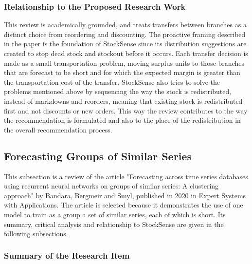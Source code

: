 \documentclass{StockSense}
\begin{document}
\subsubsection{Relationship to the Proposed Research Work}

This review is academically grounded, and treats transfers between branches as a distinct choice from reordering and discounting. The proactive framing described in the paper is the foundation of StockSense since its distribution suggestions are created to stop dead stock and stockout before it occurs. Each transfer decision is made as a small transportation problem, moving surplus units to those branches that are forecast to be short and for which the expected margin is greater than the transportation cost of the transfer. StockSense also tries to solve the problems mentioned above by sequencing the way the stock is redistributed, instead of markdowns and reorders, meaning that existing stock is redistributed first and not discounts or new orders. This way the review contributes to the way the recommendation is formulated and also to the place of the redistribution in the overall recommendation process.

\subsection{Forecasting Groups of Similar Series}

This subsection is a review of the article "Forecasting across time series databases using recurrent neural networks on groups of similar series: A clustering approach" by Bandara, Bergmeir and Smyl, published in 2020 in Expert Systems with Applications. The article is selected because it demonstrates the use of one model to train as a group a set of similar series, each of which is short. Its summary, critical analysis and relationship to StockSense are given in the following subsections.

\subsubsection{Summary of the Research Item}
\end{document}
